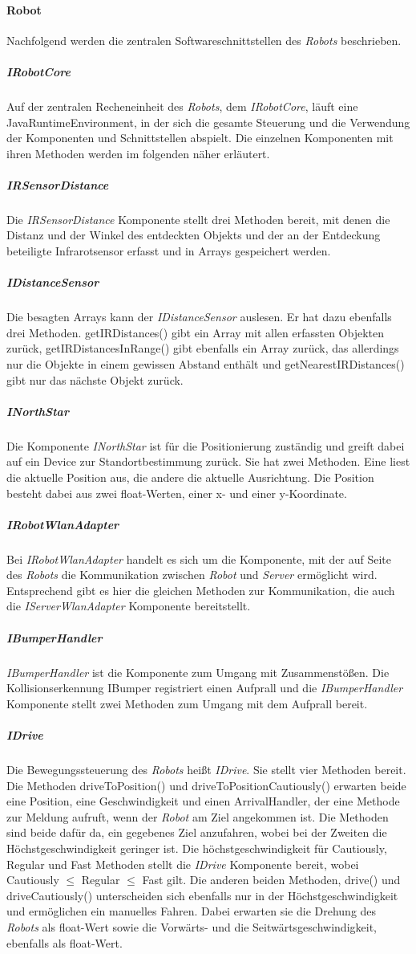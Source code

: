     \paragraph{Robot}\label{robot}
    		Nachfolgend werden die zentralen Softwareschnittstellen des \emph{Robots} beschrieben.
    	\subparagraph{IRobotCore}\label{irobotcore}
    		Auf der zentralen Recheneinheit des \emph{Robots}, dem \emph{IRobotCore}, läuft eine JavaRuntimeEnvironment, in der sich die gesamte Steuerung und die Verwendung der Komponenten und Schnittstellen abspielt. Die einzelnen Komponenten mit ihren Methoden werden im folgenden näher erläutert.
    	\subparagraph{IRSensorDistance}\label{irsensordistance}
    		Die \emph{IRSensorDistance} Komponente stellt drei Methoden bereit, mit denen die Distanz und der Winkel des entdeckten Objekts und der an der Entdeckung beteiligte Infrarotsensor erfasst und in Arrays gespeichert werden.
    	\subparagraph{IDistanceSensor}\label{idistancesensor}
    		Die besagten Arrays kann der \emph{IDistanceSensor} auslesen. Er hat dazu ebenfalls drei Methoden. getIRDistances() gibt ein Array mit allen erfassten Objekten zurück, getIRDistancesInRange() gibt ebenfalls ein Array zurück, das allerdings nur die Objekte in einem gewissen Abstand enthält und getNearestIRDistances() gibt nur das nächste Objekt zurück.
    	\subparagraph{INorthStar}\label{inorthstar}
    		Die Komponente \emph{INorthStar} ist für die Positionierung zuständig und greift dabei auf ein Device zur Standortbestimmung zurück. Sie hat zwei Methoden. Eine liest die aktuelle Position aus, die andere die aktuelle Ausrichtung. Die Position besteht dabei aus zwei float-Werten, einer x- und einer y-Koordinate.
    	\subparagraph{IRobotWlanAdapter}\label{irobotwlanadapter}
    		Bei \emph{IRobotWlanAdapter} handelt es sich um die Komponente, mit der auf Seite des \emph{Robots} die Kommunikation zwischen \emph{Robot} und \emph{Server} ermöglicht wird. Entsprechend gibt es hier die gleichen Methoden zur Kommunikation, die auch die \emph{IServerWlanAdapter} Komponente bereitstellt.
    	\subparagraph{IBumperHandler}\label{ibumperhandler}
    		\emph{IBumperHandler} ist die Komponente zum Umgang mit Zusammenstößen. Die Kollisionserkennung IBumper registriert einen Aufprall und die \emph{IBumperHandler} Komponente stellt zwei Methoden zum Umgang mit dem Aufprall bereit.
    	\subparagraph{IDrive}\label{idrive}
    		Die Bewegungssteuerung des \emph{Robots} heißt \emph{IDrive}. Sie stellt vier Methoden bereit. Die Methoden driveToPosition() und driveToPositionCautiously() erwarten beide eine Position, eine Geschwindigkeit und einen ArrivalHandler, der eine Methode zur Meldung aufruft, wenn der \emph{Robot} am Ziel angekommen ist. Die Methoden sind beide dafür da, ein gegebenes Ziel anzufahren, wobei bei der Zweiten die Höchstgeschwindigkeit geringer ist. Die höchstgeschwindigkeit für Cautiously, Regular und Fast Methoden stellt die \emph{IDrive} Komponente bereit, wobei Cautiously $\leq$ Regular $\leq$ Fast gilt. Die anderen beiden Methoden, drive() und driveCautiously() unterscheiden sich ebenfalls nur in der Höchstgeschwindigkeit und ermöglichen ein manuelles Fahren. Dabei erwarten sie die Drehung des \emph{Robots} als float-Wert sowie die Vorwärts- und die Seitwärtsgeschwindigkeit, ebenfalls als float-Wert.
